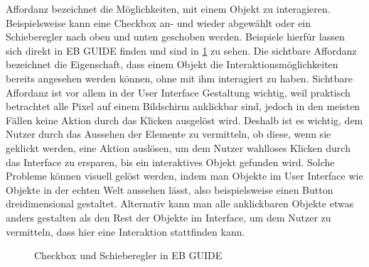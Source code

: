 Affordanz bezeichnet die Möglichkeiten, mit einem Objekt zu interagieren. Beispielsweise kann eine Checkbox an- und wieder abgewählt oder ein Schieberegler nach oben und unten geschoben werden.
Beispiele hierfür lassen sich direkt in EB GUIDE finden und sind in \cref{fig:Checkbox} zu sehen.
Die sichtbare Affordanz bezeichnet die Eigenschaft, dass einem Objekt die Interaktionsmöglichkeiten bereits angesehen werden können, ohne mit ihm interagiert zu haben.
Sichtbare Affordanz ist vor allem in der User Interface Gestaltung wichtig, weil praktisch betrachtet alle Pixel auf einem Bildschirm anklickbar sind, jedoch in den meisten Fällen keine Aktion durch das Klicken ausgelöst wird.
Deshalb ist es wichtig, dem Nutzer durch das Aussehen der Elemente zu vermitteln, ob diese, wenn sie geklickt werden, eine Aktion auslösen, um dem Nutzer wahlloses Klicken durch das Interface zu ersparen, bis ein interaktives Objekt gefunden wird.
Solche Probleme können visuell gelöst werden, indem man Objekte im User Interface wie Objekte in der echten Welt aussehen lässt, also beispielsweise einen Button dreidimensional gestaltet.
Alternativ kann man alle anklickbaren Objekte etwas anders gestalten als den Rest der Objekte im Interface, um dem Nutzer zu vermitteln, dass hier eine Interaktion stattfinden kann\cite{Knight.2019c}.

\begin{figure}[H]
\centering
{}%
\qquad
{}%
\caption{Checkbox und Schieberegler in EB GUIDE}%
\label{fig:Checkbox}
\end{figure}


